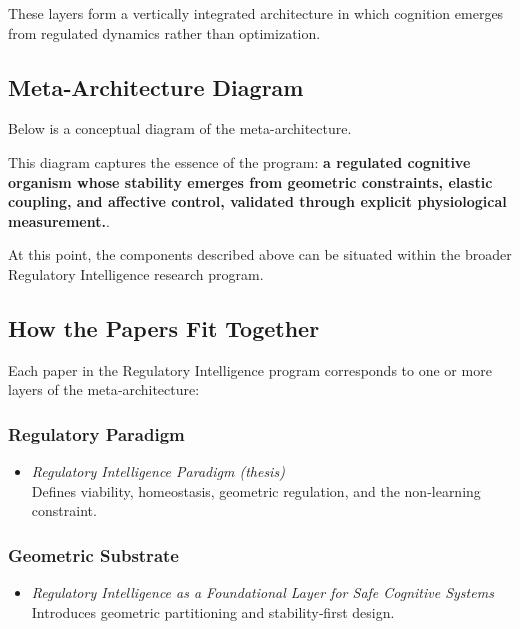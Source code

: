 \documentclass[12pt,a4paper]{report}
\begin{document}
These layers form a vertically integrated architecture in which cognition emerges from regulated dynamics rather than optimization.

\subsection{Meta‑Architecture Diagram}

Below is a conceptual diagram of the meta-architecture.



This diagram captures the essence of the program: \textbf{a regulated cognitive organism whose stability emerges from geometric constraints, elastic coupling, and affective control, validated through explicit physiological measurement.}.

At this point, the components described above can be situated within the broader Regulatory Intelligence research program.




\subsection{How the Papers Fit Together}

Each paper in the Regulatory Intelligence program corresponds to one or more layers of the meta‑architecture:

\subsubsection{Regulatory Paradigm}
\begin{itemize}
\item \textit{Regulatory Intelligence Paradigm (thesis)} \cite{RegulatoryIntelligenceParadigm2026} \\
  Defines viability, homeostasis, geometric regulation, and the non‑learning constraint.
\end{itemize}

\subsubsection{Geometric Substrate}
\begin{itemize}
\item \textit{Regulatory Intelligence as a Foundational Layer for Safe Cognitive Systems} \cite{RIAsSubstrate2026} \\
  Introduces geometric partitioning and stability‑first design.
\end{itemize}
\end{document}
